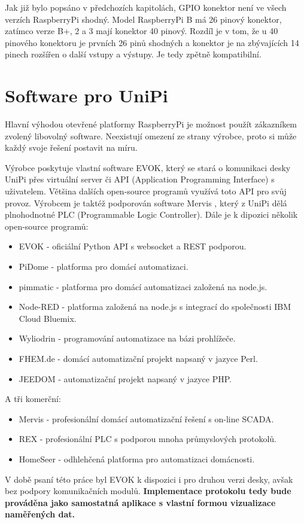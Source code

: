Jak již bylo popsáno v předchozích kapitolách, GPIO konektor není ve všech verzích RaspberryPi shodný. Model RaspberryPi B má 26 pinový konektor, zatímco verze B+, 2 a 3 mají konektor 40 pinový. Rozdíl je v tom, že u 40 pinového konektoru je prvních 26 pinů shodných a konektor je na zbývajících 14 pinech rozšířen o další vstupy a výstupy. Je tedy zpětně kompatibilní.




\section{Software pro UniPi}

Hlavní výhodou otevřené platformy RaspberryPi je možnost použít zákazníkem zvolený libovolný software. Neexistují omezení ze strany výrobce, proto si může každý svoje řešení postavit na míru.

Výrobce poskytuje vlastní software EVOK, který se stará o komunikaci desky UniPi přes virtuální server či API (Application Programming Interface) s uživatelem. Většina dalších open-source programů využívá toto API pro svůj provoz. Výrobcem je taktéž podporován software Mervis \cite{MervisWeb}, který z UniPi dělá plnohodnotné PLC (Programmable Logic Controller). Dále je k dipozici několik open-source programů:
\begin{itemize}
\item EVOK - oficiální Python API s websocket a REST podporou.
\item PiDome - platforma pro domácí automatizaci.
\item pimmatic - platforma pro domácí automatizaci založená na node.js.
\item Node-RED - platforma založená na node.js s integrací do společnosti IBM Cloud Bluemix.
\item Wyliodrin - programování automatizace na bázi prohlížeče.
\item FHEM.de - domácí automatizační projekt napsaný v jazyce Perl.
\item JEEDOM - automatizační projekt napsaný v jazyce PHP.
\end{itemize}

\vspace{10pt}
A tři komerční:
\begin{itemize}
\item Mervis - profesionální domácí automatizační řešení s on-line SCADA.
\item REX - profesionální PLC s podporou mnoha průmyslových protokolů.
\item HomeSeer - odhlehčená platforma pro automatizaci domácnosti.
\end{itemize}

\vspace{10pt}
V době psaní této práce byl EVOK k dispozici i pro druhou verzi desky, avšak bez podpory komunikačních modulů. \textbf{Implementace protokolu tedy bude prováděna jako samostatná aplikace s vlastní formou vizualizace naměřených dat.}





 
